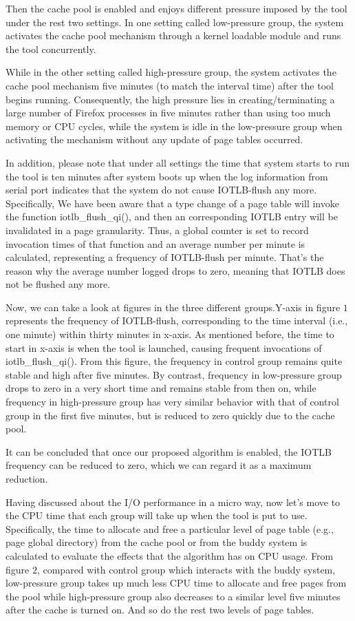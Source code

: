 \documentclass[letterpaper,twocolumn,10pt]{article}
\begin{document}
Then the cache pool is enabled and enjoys different pressure imposed by the tool under the rest two settings. In one setting called low-pressure group, the system activates the cache pool mechanism through a kernel loadable module and runs the tool concurrently.

While in the other setting called high-pressure group, the system activates the cache pool mechanism five minutes (to match the interval time) after the tool begins running. Consequently, the high pressure lies in creating/terminating a large number of Firefox processes in five minutes rather than using too much memory or CPU cycles, while the system is idle in the low-pressure group when activating the mechanism without any update of page tables occurred.

In addition, please note that under all settings the time that system starts to run the tool is ten minutes after system boots up when the log information from serial port indicates that the system do not cause IOTLB-flush any more. Specifically, We have been aware that a type change of a page table will invoke the function iotlb\_flush\_qi(), and then an corresponding IOTLB entry will be invalidated in a page granularity. Thus, a global counter is set to record invocation times of that function and an average number per minute is calculated, representing a frequency of IOTLB-flush per minute. That’s the reason why the average number logged drops to zero, meaning that IOTLB does not be flushed any more.

Now, we can take a look at figures in the three different groups.Y-axis in figure $1$ represents the frequency of IOTLB-flush, corresponding to the time interval (i.e., one minute) within thirty minutes in x-axis. As mentioned before, the time to start in x-axis is when the tool is launched, causing frequent invocations of iotlb\_flush\_qi().
From this figure, the frequency in control group remains quite stable and high after five minutes. By contrast, frequency in low-pressure group drops to zero in a very short time and remains stable from then on, while frequency in high-pressure group has very similar behavior with that of control group in the first five minutes, but is reduced to zero quickly due to the cache pool.

It can be concluded that once our proposed algorithm is enabled, the IOTLB frequency can be reduced to zero, which we can regard it as a maximum reduction.

Having discussed about the I/O performance in a micro way, now let’s move to the CPU time that each group will take up when the tool is put to use. Specifically, the time to allocate and free a particular level of page table (e.g., page global directory) from the cache pool or from the buddy system is calculated to evaluate the effects that the algorithm has on CPU usage. From figure $2$, compared with control group which interacts with the buddy system, low-pressure group takes up much less CPU time to allocate and free pages from the pool while high-pressure group also decreases to a similar level five minutes after the cache is turned on. And so do the rest two levels of page tables.
\end{document}
